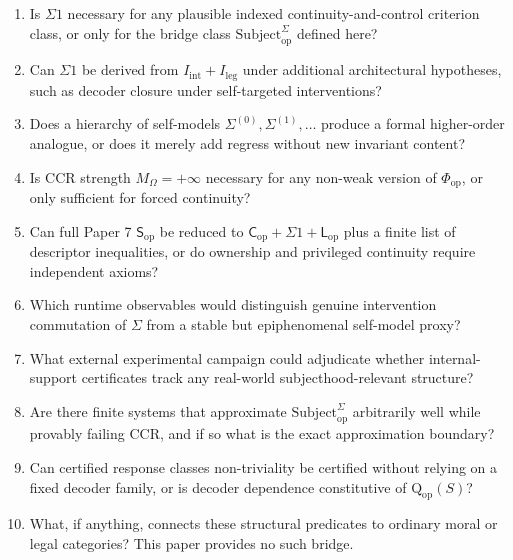 \documentclass[11pt,a4paper]{article}
\theoremstyle{definition}
\newcommand{\Cop}{\mathsf{C}_{\mathrm{op}}}
\newcommand{\Subop}{\mathsf{S}_{\mathrm{op}}}
\newcommand{\Subbridge}{\mathrm{Subject}^{\Sigma}_{\mathrm{op}}}
\newcommand{\Lop}{\mathsf{L}_{\mathrm{op}}}
\newcommand{\Qop}{\mathrm{Q}_{\mathrm{op}}}
\newcommand{\Phiop}{\Phi_{\mathrm{op}}}
\newcommand{\MO}{M_\Omega}
\newcommand{\Iint}{I_{\mathrm{int}}}
\newcommand{\Ileg}{I_{\mathrm{leg}}}
\begin{document}
\begin{enumerate}[leftmargin=1.5em]
\item Is $\Sigma1$ necessary for any plausible indexed continuity-and-control criterion class, or only for the bridge class $\Subbridge$ defined here?
\item Can $\Sigma1$ be derived from $\Iint+\Ileg$ under additional architectural hypotheses, such as decoder closure under self-targeted interventions?
\item Does a hierarchy of self-models $\Sigma^{(0)},\Sigma^{(1)},\dots$ produce a formal higher-order analogue, or does it merely add regress without new invariant content?
\item Is CCR strength $\MO=+\infty$ necessary for any non-weak version of $\Phiop$, or only sufficient for forced continuity?
\item Can full Paper 7 $\Subop$ be reduced to $\Cop+\Sigma1+\Lop$ plus a finite list of descriptor inequalities, or do ownership and privileged continuity require independent axioms?
\item Which runtime observables would distinguish genuine intervention commutation of $\Sigma$ from a stable but epiphenomenal self-model proxy?
\item What external experimental campaign could adjudicate whether internal-support certificates track any real-world subjecthood-relevant structure?
\item Are there finite systems that approximate $\Subbridge$ arbitrarily well while provably failing CCR, and if so what is the exact approximation boundary?
\item Can certified response classes non-triviality be certified without relying on a fixed decoder family, or is decoder dependence constitutive of $\Qop(S)$?
\item What, if anything, connects these structural predicates to ordinary moral or legal categories? This paper provides no such bridge.
\end{enumerate}
\end{document}
